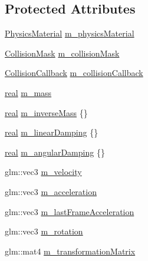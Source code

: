 \subsection*{Protected Attributes}
\begin{DoxyCompactItemize}
\item 
\mbox{\hyperlink{classr3_1_1_physics_material}{Physics\+Material}} \mbox{\hyperlink{classr3_1_1_rigid_body_abcd4f744963b80cc1d592ccec117fd54}{m\+\_\+physics\+Material}}
\item 
\mbox{\hyperlink{structr3_1_1_collision_mask}{Collision\+Mask}} \mbox{\hyperlink{classr3_1_1_rigid_body_a9ce3f6c2a0f158d9df5910c3697ebf7f}{m\+\_\+collision\+Mask}}
\item 
\mbox{\hyperlink{classr3_1_1_collision_callback}{Collision\+Callback}} \mbox{\hyperlink{classr3_1_1_rigid_body_a88185161bb32b108719e78a3944d5257}{m\+\_\+collision\+Callback}}
\item 
\mbox{\hyperlink{namespacer3_ab2016b3e3f743fb735afce242f0dc1eb}{real}} \mbox{\hyperlink{classr3_1_1_rigid_body_a9ecbd510187cfaaee3154d11f3bd782b}{m\+\_\+mass}}
\item 
\mbox{\hyperlink{namespacer3_ab2016b3e3f743fb735afce242f0dc1eb}{real}} \mbox{\hyperlink{classr3_1_1_rigid_body_a57f0423607e2ce9738a2fa796a443e5f}{m\+\_\+inverse\+Mass}} \{\}
\item 
\mbox{\hyperlink{namespacer3_ab2016b3e3f743fb735afce242f0dc1eb}{real}} \mbox{\hyperlink{classr3_1_1_rigid_body_aa7ae14fd779acb22a7c50aab88d1cb75}{m\+\_\+linear\+Damping}} \{\}
\item 
\mbox{\hyperlink{namespacer3_ab2016b3e3f743fb735afce242f0dc1eb}{real}} \mbox{\hyperlink{classr3_1_1_rigid_body_a3d9cfac391d02a657401f5e633361fe9}{m\+\_\+angular\+Damping}} \{\}
\item 
glm\+::vec3 \mbox{\hyperlink{classr3_1_1_rigid_body_a2de7cddcf262009fc8261688d1e56c49}{m\+\_\+velocity}}
\item 
glm\+::vec3 \mbox{\hyperlink{classr3_1_1_rigid_body_a3be64b2b09846d33ccdd9e276db020b9}{m\+\_\+acceleration}}
\item 
glm\+::vec3 \mbox{\hyperlink{classr3_1_1_rigid_body_aafe21461c488f0dffbbb2bd0c32f4585}{m\+\_\+last\+Frame\+Acceleration}}
\item 
glm\+::vec3 \mbox{\hyperlink{classr3_1_1_rigid_body_ad2b79563010507bc1ab9d34a47e48bfc}{m\+\_\+rotation}}
\item 
glm\+::mat4 \mbox{\hyperlink{classr3_1_1_rigid_body_ab973e24d84aedb3188aa04fcd2817228}{m\+\_\+transformation\+Matrix}}
\item 

\end{DoxyCompactItemize}
